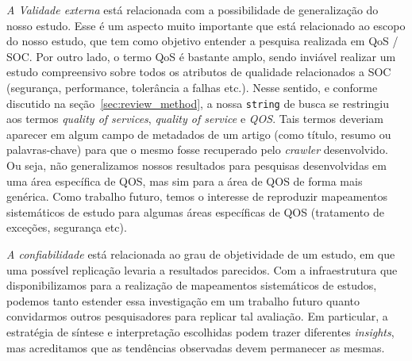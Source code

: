 \noindent
\emph{A Validade externa} est\'{a} relacionada com a possibilidade de
generaliza\c c\~{a}o do nosso estudo. Esse \'{e} um aspecto muito
importante que est\'{a} relacionado ao escopo do nosso estudo, que tem
como objetivo entender a pesquisa realizada em QoS / SOC. Por outro
lado, o termo QoS \'{e} bastante amplo, sendo invi\'{a}vel realizar
um estudo compreensivo sobre todos os atributos de qualidade
relacionados a SOC (seguran\c ca, performance, toler\^{a}ncia a falhas
etc.). Nesse sentido, e conforme discutido na se\c{c}\~{a}o~\ref{sec:review_method}, a nossa \texttt{string} de busca se restringiu aos termos \emph{quality of services}, \emph{quality of service} e \emph{QOS}. Tais termos deveriam aparecer em algum campo de metadados de um artigo (como t\'{i}tulo, resumo ou palavras-chave) para que o mesmo fosse recuperado pelo \emph{crawler} desenvolvido. Ou seja, n\~{a}o generalizamos nossos resultados para pesquisas desenvolvidas em uma \'{a}rea espec\'{i}fica de QOS, mas sim para a \'{a}rea de QOS de forma mais gen\'{e}rica. Como
trabalho futuro, temos o interesse de reproduzir mapeamentos sistem\'{a}ticos de estudo para algumas \'{a}reas espec\'{i}ficas de QOS (tratamento de exce\c
c\~{o}es, seguran\c ca etc). 

\noindent
\emph{A confiabilidade} est\'{a} relacionada ao grau de objetividade de
um estudo, em que uma poss\'{i}vel replica\c c\~{a}o levaria a
resultados parecidos. Com a infraestrutura que disponibilizamos para a realiza\c{c}\~{a}o de mapeamentos sistem\'{a}ticos de estudos, podemos tanto estender essa investiga\c c\~{a}o em um trabalho futuro quanto convidarmos outros pesquisadores para replicar tal avalia\c c\~{a}o. Em particular, a estrat\'{e}gia de s\'{i}ntese e interpreta\c{c}\~{a}o escolhidas podem trazer diferentes \emph{insights}, mas acreditamos que as tend\^{e}ncias observadas devem permanecer as mesmas.